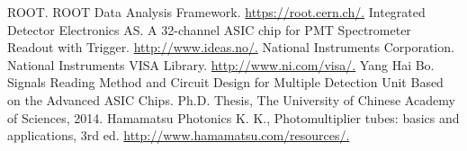 \documentclass{nst}
\begin{document}
\begin{thebibliography}{99}
	 ROOT.  ROOT Data Analysis Framework. \href{https://root.cern.ch/}{https://root.cern.ch/.}
	 Integrated Detector Electronics AS.  A 32-channel ASIC chip for PMT Spectrometer Readout with Trigger. \href{http://www.ideas.no/products/ide3160-2/}{http://www.ideas.no/.}
	 National Instruments Corporation.  National Instruments {VISA} Library. \href{http://www.ni.com/visa/}{http://www.ni.com/visa/.}
	 Yang Hai Bo. Signals Reading Method and Circuit Design for Multiple Detection Unit Based on the Advanced {ASIC} Chips. Ph.D. Thesis, The University of Chinese Academy of Sciences, 2014.
	 Hamamatsu Photonics K. K., Photomultiplier tubes: basics and applications, 3rd ed.
	\href{http://www.hamamatsu.com/resources/pdf/etd/PMT_handbook_v3aE.pdf}{http://www.hamamatsu.com/resources/.}
\end{thebibliography}


%
\end{document}
